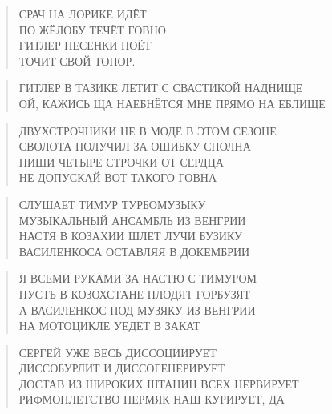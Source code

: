 \poemtitle{***}
\begin{verse}
СРАЧ НА ЛОРИКЕ ИДЁТ\\
ПО ЖЁЛОБУ ТЕЧЁТ ГОВНО\\
ГИТЛЕР ПЕСЕНКИ ПОЁТ\\
ТОЧИТ СВОЙ ТОПОР.
\end{verse}

\poemtitle{***}
\begin{verse}
ГИТЛЕР В ТАЗИКЕ ЛЕТИТ С СВАСТИКОЙ НАДНИЩЕ\\
ОЙ, КАЖИСЬ ЩА НАЕБНЁТСЯ МНЕ ПРЯМО НА ЕБЛИЩЕ
\end{verse}

\poemtitle{***}
\begin{verse}
ДВУХСТРОЧНИКИ НЕ В МОДЕ В ЭТОМ СЕЗОНЕ\\
СВОЛОТА ПОЛУЧИЛ ЗА ОШИБКУ СПОЛНА\\
ПИШИ ЧЕТЫРЕ СТРОЧКИ ОТ СЕРДЦА\\
НЕ ДОПУСКАЙ ВОТ ТАКОГО ГОВНА
\end{verse}

\poemtitle{***}
\begin{verse}
СЛУШАЕТ ТИМУР ТУРБОМУЗЫКУ\\
МУЗЫКАЛЬНЫЙ АНСАМБЛЬ ИЗ ВЕНГРИИ\\
НАСТЯ В КОЗАХИИ ШЛЕТ ЛУЧИ БУЗИКУ\\
ВАСИЛЕНКОСА ОСТАВЛЯЯ В ДОКЕМБРИИ
\end{verse}

\poemtitle{***}
\begin{verse}
Я ВСЕМИ РУКАМИ ЗА НАСТЮ С ТИМУРОМ\\
ПУСТЬ В КОЗОХСТАНЕ ПЛОДЯТ ГОРБУЗЯТ\\
А ВАСИЛЕНКОС ПОД МУЗЯКУ ИЗ ВЕНГРИИ\\
НА МОТОЦИКЛЕ УЕДЕТ В ЗАКАТ
\end{verse}

\poemtitle{***}
\begin{verse}
СЕРГЕЙ УЖЕ ВЕСЬ ДИССОЦИИРУЕТ\\
ДИССОБУРЛИТ И ДИССОГЕНЕРИРУЕТ\\
ДОСТАВ ИЗ ШИРОКИХ ШТАНИН ВСЕХ НЕРВИРУЕТ\\
РИФМОПЛЕТСТВО ПЕРМЯК НАШ КУРИРУЕТ, ДА
\end{verse}

